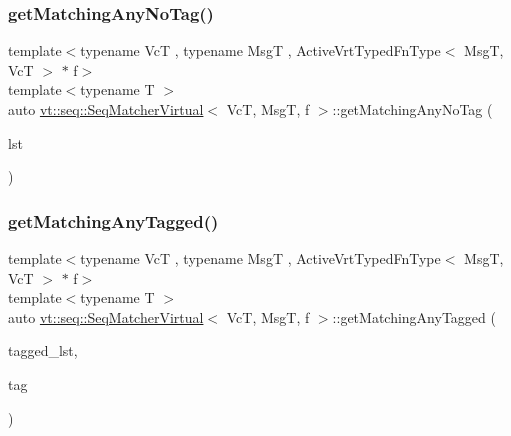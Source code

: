 \mbox{\label{structvt_1_1seq_1_1_seq_matcher_virtual_a5c2e339746b1aa156dce23ec95ab806a}} 
\subsubsection{\texorpdfstring{get\+Matching\+Any\+No\+Tag()}{getMatchingAnyNoTag()}}
{\footnotesize\ttfamily template$<$typename VcT , typename MsgT , Active\+Vrt\+Typed\+Fn\+Type$<$ Msg\+T, Vc\+T $>$ $\ast$ f$>$ \\
template$<$typename T $>$ \\
auto \hyperlink{structvt_1_1seq_1_1_seq_matcher_virtual}{vt\+::seq\+::\+Seq\+Matcher\+Virtual}$<$ VcT, MsgT, f $>$\+::get\+Matching\+Any\+No\+Tag (\begin{DoxyParamCaption}\item[{\hyperlink{structvt_1_1seq_1_1_seq_matcher_virtual_a1ce5abe53e93d69d1b487e97fd30fdbd}{Seq\+State\+Cont\+Type}$<$ T $>$ \&}]{lst }\end{DoxyParamCaption})\hspace{0.3cm}{\ttfamily [static]}}

\mbox{\label{structvt_1_1seq_1_1_seq_matcher_virtual_ad76832cd659402775f98a6ba874d7421}} 
\subsubsection{\texorpdfstring{get\+Matching\+Any\+Tagged()}{getMatchingAnyTagged()}}
{\footnotesize\ttfamily template$<$typename VcT , typename MsgT , Active\+Vrt\+Typed\+Fn\+Type$<$ Msg\+T, Vc\+T $>$ $\ast$ f$>$ \\
template$<$typename T $>$ \\
auto \hyperlink{structvt_1_1seq_1_1_seq_matcher_virtual}{vt\+::seq\+::\+Seq\+Matcher\+Virtual}$<$ VcT, MsgT, f $>$\+::get\+Matching\+Any\+Tagged (\begin{DoxyParamCaption}\item[{\hyperlink{structvt_1_1seq_1_1_seq_matcher_virtual_ab6b75c420d0d3e46e729188d07c11ff2}{Seq\+State\+Tagged\+Cont\+Type}$<$ T $>$ \&}]{tagged\+\_\+lst,  }\item[{\hyperlink{namespacevt_a84ab281dae04a52a4b243d6bf62d0e52}{Tag\+Type} const \&}]{tag }\end{DoxyParamCaption})\hspace{0.3cm}{\ttfamily [static]}}

